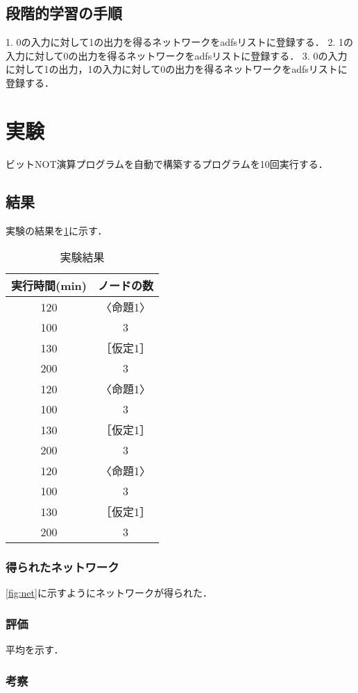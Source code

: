\documentclass[exploratorypaper]{jsaiart} %
\begin{document}
\subsection{段階的学習の手順}
1. 0の入力に対して1の出力を得るネットワークをadfsリストに登録する．
2. 1の入力に対して0の出力を得るネットワークをadfsリストに登録する．
3. 0の入力に対して1の出力，1の入力に対して0の出力を得るネットワークをadfsリストに登録する．

\section{実験}
ビットNOT演算プログラムを自動で構築するプログラムを10回実行する．
\subsection{結果}
実験の結果を\ref{tbl:result}に示す．

\begin{table}[htbp]
\centering
\caption{実験結果}
\label{tbl:result}
\begin{tabular}{cc}
    \hline
     実行時間(min) & ノードの数\\
    \hline
    120 & 〈命題1〉 \\
    100 & 3 \\
    \hline
    130 & ［仮定1］ \\
    200 & 3 \\
    \hline
    120 & 〈命題1〉 \\
    100 & 3 \\
    \hline
    130 & ［仮定1］ \\
    200 & 3 \\
    \hline
    120 & 〈命題1〉 \\
    100 & 3 \\
    \hline
    130 & ［仮定1］ \\
    200 & 3 \\
    \hline
\end{tabular}
\end{table}

\subsubsection{得られたネットワーク}
\ref{fig:net}に示すようにネットワークが得られた．
\subsubsection{評価}
平均を示す．
\subsubsection{考察}
\end{document}
